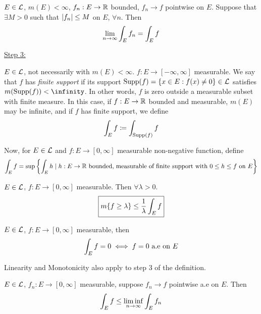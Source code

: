 \begin{theorem}
    $E \in \mathcal{L}$, $m(E) < \infty$, $f_n: E \rightarrow \mathbb{R}$ bounded, $f_n \rightarrow f$ pointwise on $E$.
    Suppose that $\exists M > 0$ such that $\lvert f_n\rvert \leq M$ on $E$, $\forall n$.
    Then
    \[
        \lim_{n \rightarrow \infty} \int_{E} f_n = \int_{E} f
    \]
\end{theorem}

\underline{Step 3:}

\begin{definition}
    $E \in \mathcal{L}$, not necessarily with $m(E) < \infty$.
    $f: E \rightarrow [-\infty, \infty]$ measurable.
    We say that $f$ has \emph{finite support} if its support $\text{Supp}(f) = \{ x \in E: f(x) \neq 0 \} \in \mathcal{L}$ satisfies $m(\text{Supp}(f)) < \infinity$.
    In other words, $f$ is zero outside a measurable subset with finite measure.
    In this case, if $f: E \rightarrow \mathbb{R}$ bounded and measurable, $m(E)$ may be infinite, and if $f$ has finite support, we define
    \[
        \int_{E} f \coloneqq \int_{\text{Supp}(f)} f
    \]
\end{definition}

Now, for $E \in \mathcal{L}$ and $f: E \rightarrow [0, \infty]$ measurable non-negative function, define
\[
    \int_{E} f = \sup \left\{ \int_{E} h \mid h: E \rightarrow \mathbb{R} \text{ bounded, measurable of finite support with } 0 \leq h \leq f \text{ on } E \right\}
\]

\begin{theorem}
    $E \in \mathcal{L}$, $f: E \rightarrow [0,\infty]$ measurable.
    Then $\forall \lambda > 0$.
    \[
        \boxed{m \{ f \geq \lambda \} \leq \frac{1}{\lambda} \int_{E} f}
    \]

\end{theorem}

\begin{corollary}
    $E \in \mathcal{L}$, $f: E \rightarrow [0, \infty]$ measurable, then
    \[
        \int_{E} f = 0 \iff f = 0 \text{ a.e} \text{ on } E
    \]
\end{corollary}

Linearity and Monotonicity also apply to step 3 of the definition.

\begin{prop}
    $E \in \mathcal{L}$, $f_n: E \rightarrow [0, \infty]$ measurable, suppose $f_n \rightarrow f$ pointwise a.e on $E$.
    Then
    \[
        \int_{E} f \leq \liminf_{n \rightarrow \infty} \int_{E} f_n
    \]
\end{prop}

